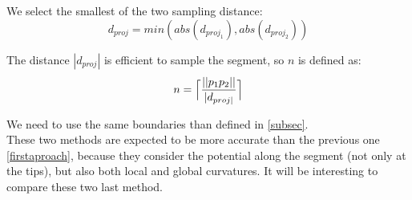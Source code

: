 \documentclass[11pt,a4paper]{article}
\begin{document}
We select the smallest of the two sampling distance:
\begin{equation}
d_{proj} = min(abs(d_{proj_1}), abs(d_{proj_2}))
\end{equation}

The distance $|d_{proj}|$ is efficient to sample the segment, so $n$ is defined as:
\begin{equation}
n = \Bigl\lceil\frac{||p_1p_2||}{|d_{proj|}}\Bigr\rceil
\end{equation}

We need to use the same boundaries than defined in \ref{subsec}.\\




These two methods are expected to be more accurate than the previous one \ref{firstaproach}, because they consider the potential along the segment (not only at the tips), but also both local and global curvatures.
It will be interesting to compare these two last method.




	
\end{document}
